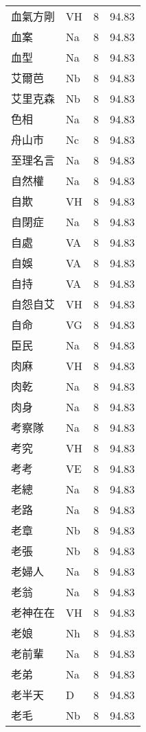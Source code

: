 \documentclass[twocolumn]{book}
\begin{document}
\setcounter{page}{345}
\twocolumn
\pagestyle{fancy}
\rhead{\thepage}
\rhead[\thepage]{\thepage}
\cfoot{}
\begin{supertabular}{llrr}
血氣方剛 & VH & 8 &  94.83\\
血案 & Na & 8 &  94.83\\
血型 & Na & 8 &  94.83\\
艾爾芭 & Nb & 8 &  94.83\\
艾里克森 & Nb & 8 &  94.83\\
色相 & Na & 8 &  94.83\\
舟山市 & Nc & 8 &  94.83\\
至理名言 & Na & 8 &  94.83\\
自然權 & Na & 8 &  94.83\\
自欺 & VH & 8 &  94.83\\
自閉症 & Na & 8 &  94.83\\
自處 & VA & 8 &  94.83\\
自娛 & VA & 8 &  94.83\\
自持 & VA & 8 &  94.83\\
自怨自艾 & VH & 8 &  94.83\\
自命 & VG & 8 &  94.83\\
臣民 & Na & 8 &  94.83\\
肉麻 & VH & 8 &  94.83\\
肉乾 & Na & 8 &  94.83\\
肉身 & Na & 8 &  94.83\\
考察隊 & Na & 8 &  94.83\\
考究 & VH & 8 &  94.83\\
考考 & VE & 8 &  94.83\\
老總 & Na & 8 &  94.83\\
老路 & Na & 8 &  94.83\\
老章 & Nb & 8 &  94.83\\
老張 & Nb & 8 &  94.83\\
老婦人 & Na & 8 &  94.83\\
老翁 & Na & 8 &  94.83\\
老神在在 & VH & 8 &  94.83\\
老娘 & Nh & 8 &  94.83\\
老前輩 & Na & 8 &  94.83\\
老弟 & Na & 8 &  94.83\\
老半天 & D & 8 &  94.83\\
老毛 & Nb & 8 &  94.83\\

\end{supertabular}
\end{document}
